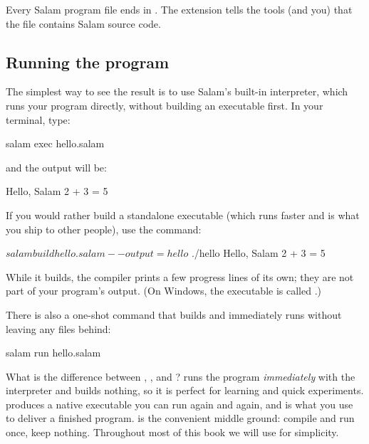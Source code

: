 \begin{note}
Every Salam program file ends in . The extension tells the tools
(and you) that the file contains Salam source code.
\end{note}

\subsection{Running the program}

The simplest way to see the result is to use Salam's built-in interpreter, which
runs your program directly, without building an executable first. In your terminal, type:

\begin{shell}
salam exec hello.salam
\end{shell}

and the output will be:

\begin{progout}
Hello, Salam
2 + 3 = 5
\end{progout}

If you would rather build a standalone executable (which runs faster and is what
you ship to other people), use the  command:

\begin{shell}
$ salam build hello.salam --output=hello
$ ./hello
Hello, Salam
2 + 3 = 5
\end{shell}

\noindent While it builds, the compiler prints a few progress lines of its own;
they are not part of your program's output. (On Windows, the executable is
called .)

There is also a one-shot  command that builds and immediately runs
without leaving any files behind:

\begin{shell}
salam run hello.salam
\end{shell}

\begin{tip}
What is the difference between , , and ?
 runs the program \emph{immediately} with the interpreter and builds
nothing, so it is perfect for learning and quick experiments.
 produces a native executable you can run again and again, and is
what you use to deliver a finished program.  is the convenient middle
ground: compile and run once, keep nothing. Throughout most of this book we will
use  for simplicity.
\end{tip}

